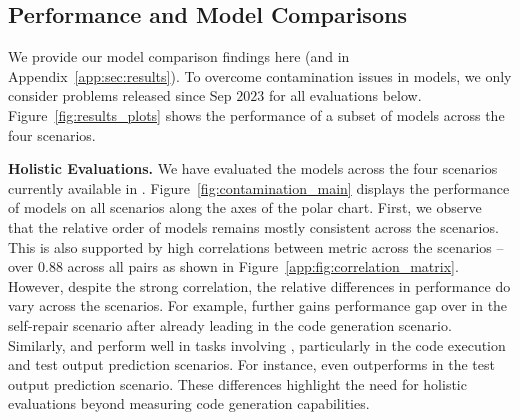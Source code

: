 \subsection{Performance and Model Comparisons}
\label{subsec:model_comparisions}
We provide our model comparison findings here (and in Appendix~\ref{app:sec:results}).
To overcome contamination issues in \deepseek{} models, we only consider problems released since Sep $2023$ for all evaluations below.
Figure~\ref{fig:results_plots} shows the performance of a subset of models across the four scenarios. 


\noindent \textbf{Holistic Evaluations.}
We have evaluated the models across the four scenarios currently available in \livecodebench{}.
Figure~\ref{fig:contamination_main} displays the performance of models on all scenarios along the axes of the polar chart.
First, we observe that the relative order of models remains mostly consistent across the scenarios.
This is also supported by high correlations between  metric across the scenarios -- 
over $0.88$ across all pairs as shown in Figure~\ref{app:fig:correlation_matrix}.
However, despite the strong correlation, the relative differences in performance do vary across the scenarios.
For example, \gptfourturbo{} further gains performance gap over \gptfour{} in the self-repair scenario after already leading in the code generation scenario.
Similarly, \claudeopus{} and \mistrallarge{} perform well in tasks involving \chainot{}, particularly in the code execution and test output prediction scenarios.
For instance, \claudeopus{} even outperforms \gptfourturbo{} in the test output prediction scenario.
These differences highlight the need for holistic evaluations beyond measuring code generation capabilities.



